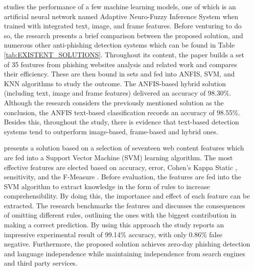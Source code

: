 \cite{INTELLIGENT_PHISHING_ANFIS} studies the performance of a few machine
learning models, one of which is an artificial neural network named Adaptive
Neuro-Fuzzy Inference System \citep{ANFIS} when trained with integrated text,
image, and frame features. Before venturing to do so, the research presents a
brief comparison between the proposed solution, and numerous other anti-phishing
detection systems which can be found in Table \ref{tab:EXISTENT_SOLUTIONS}.
Throughout its content, the paper builds a set of 35 features from phishing
websites analysis and related work and compares their efficiency. These are then
bound in sets and fed into ANFIS, SVM, and KNN algorithms to study the outcome.
The ANFIS-based hybrid solution (including text, image and frame features)
delivered an accuracy of 98.30\%. Although the research considers the previously
mentioned solution as the conclusion, the ANFIS text-based classification
records an accuracy of 98.55\%. Besides this, throughout the study, there is
evidence that text-based detection systems tend to outperform image-based,
frame-based and hybrid ones.

\cite{SVM_ANTI_PHISHING} presents a solution based on a selection of seventeen
web content features which are fed into a Support Vector Machine (SVM) learning
algorithm. The most effective features are elected based on accuracy, error,
Cohen's Kappa Static \citep{DATA_MINING_T&T}, sensitivity, and the F-Measure
\citep{DATA_MINING_T&T}. Before evaluation, the features are fed into the SVM
algorithm to extract knowledge in the form of rules to increase
comprehensibility. By doing this, the importance and effect of each feature can
be extracted. The research benchmarks the features and discusses the
consequences of omitting different rules, outlining the ones with the biggest
contribution in making a correct prediction.
By using this approach the study reports an impressive experimental result of
99.14\% accuracy, with only 0.86\% false negative. Furthermore, the proposed
solution achieves zero-day phishing detection and language independence while
maintaining independence from search engines and third party services.

